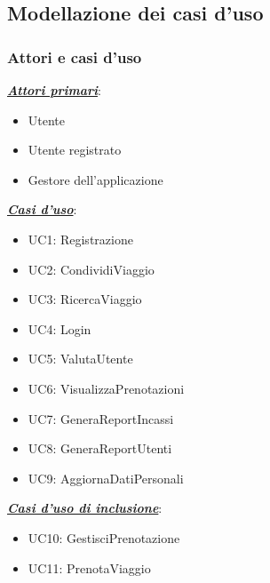 \subsection{Modellazione dei casi d'uso}

\subsubsection{Attori e casi d'uso}

\begin{flushleft}

\textbf{\textit{\underline{Attori primari}}}:

\begin{itemize}
    \item {Utente}
    \item {Utente registrato}
    \item {Gestore dell'applicazione}
\end{itemize}

\textbf{\textit{\underline{Casi d'uso}}}:

\begin{itemize}
    \item {UC1: Registrazione}
    \item {UC2: CondividiViaggio}
    \item {UC3: RicercaViaggio}
    \item {UC4: Login}
    \item {UC5: ValutaUtente}
    \item {UC6: VisualizzaPrenotazioni}
    \item {UC7: GeneraReportIncassi}
    \item {UC8: GeneraReportUtenti}
    \item {UC9: AggiornaDatiPersonali}
\end{itemize}

\textbf{\textit{\underline{Casi d'uso di inclusione}}}:
\begin{itemize}
    \item {UC10: GestisciPrenotazione}
    \item {UC11: PrenotaViaggio}
\end{itemize}


\end{flushleft}
